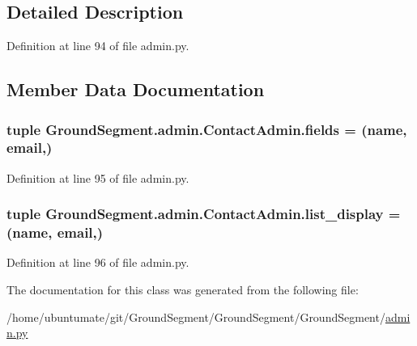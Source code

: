 \subsection{Detailed Description}


Definition at line 94 of file admin.\+py.



\subsection{Member Data Documentation}
\hypertarget{class_ground_segment_1_1admin_1_1_contact_admin_a7b3018f6da7c9eced691fae7a6229a70}{}
\subsubsection[{fields}]{\setlength{\rightskip}{0pt plus 5cm}tuple Ground\+Segment.\+admin.\+Contact\+Admin.\+fields = (\textquotesingle{}name\textquotesingle{}, \textquotesingle{}email\textquotesingle{},)\hspace{0.3cm}{\ttfamily [static]}}\label{class_ground_segment_1_1admin_1_1_contact_admin_a7b3018f6da7c9eced691fae7a6229a70}


Definition at line 95 of file admin.\+py.

\hypertarget{class_ground_segment_1_1admin_1_1_contact_admin_a6dda75f284db38fa53b8b9d4f9116459}{}
\subsubsection[{list\+\_\+display}]{\setlength{\rightskip}{0pt plus 5cm}tuple Ground\+Segment.\+admin.\+Contact\+Admin.\+list\+\_\+display = (\textquotesingle{}name\textquotesingle{}, \textquotesingle{}email\textquotesingle{},)\hspace{0.3cm}{\ttfamily [static]}}\label{class_ground_segment_1_1admin_1_1_contact_admin_a6dda75f284db38fa53b8b9d4f9116459}


Definition at line 96 of file admin.\+py.



The documentation for this class was generated from the following file\+:\begin{DoxyCompactItemize}
\item 
/home/ubuntumate/git/\+Ground\+Segment/\+Ground\+Segment/\+Ground\+Segment/\hyperlink{admin_8py}{admin.\+py}\end{DoxyCompactItemize}
